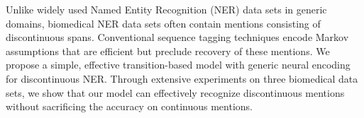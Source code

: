 Unlike widely used Named Entity Recognition (NER) data sets in generic domains, biomedical NER data sets often contain mentions consisting of discontinuous spans. Conventional sequence tagging techniques encode Markov assumptions that are efficient but preclude recovery of these mentions. We propose a simple, effective transition-based model with generic neural encoding for discontinuous NER. Through extensive experiments on three biomedical data sets, we show that our model can effectively recognize discontinuous mentions without sacrificing the accuracy on continuous mentions.

